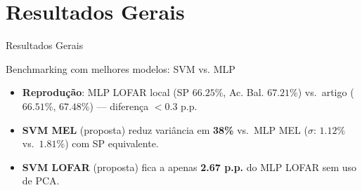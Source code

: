 \documentclass{beamer}
\begin{document}
\section{Resultados Gerais}
\begin{frame}
    \centering
    \huge Resultados Gerais
    \label{sec:results_global}
\end{frame}

\begin{frame}{Benchmarking com melhores modelos: SVM vs. MLP}
    \centering

    \vspace{0.15cm}
    \scriptsize
    \begin{itemize}
        \item \textbf{Reprodução}: MLP LOFAR local (SP $66.25\%$, Ac. Bal. $67.21\%$) vs.\ artigo ($66.51\%$, $67.48\%$) — diferença $<$0.3 p.p. \checkmark
        \item \textbf{SVM MEL} (proposta) reduz variância em \textbf{38\%} vs.\ MLP MEL ($\sigma$: $1.12\%$ vs.\ $1.81\%$) com SP equivalente.
        \item \textbf{SVM LOFAR} (proposta) fica a apenas \textbf{2.67 p.p.} do MLP LOFAR sem uso de PCA.
    \end{itemize}
\end{frame}
\end{document}
